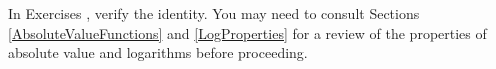 {\noindent In Exercises}
{, verify the identity.  You may need to consult Sections \ref{AbsoluteValueFunctions} and \ref{LogProperties} for a review of the properties of absolute value and logarithms before proceeding.}
